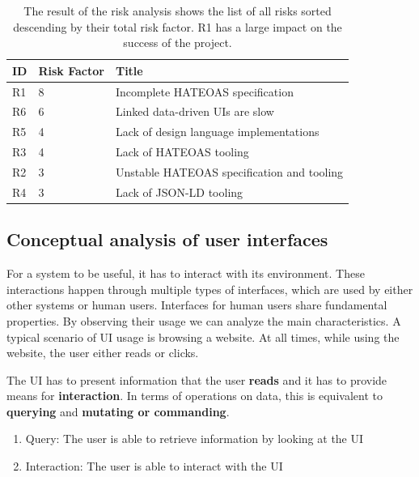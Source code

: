 \begin{table}[!htb]
  \begin{center}
    \begin{tabular}{|l|l|l|}
      \hline
      \textbf{ID} & \textbf{Risk Factor} & \textbf{Title} \\
      \hline
      \rowcolor{yellow}
      R1 & 8 & Incomplete HATEOAS specification \\
      \hline
      R6 & 6 & Linked data-driven UIs are slow \\
      \hline
      R5 & 4 & Lack of design language implementations \\
      \hline
      R3 & 4 & Lack of HATEOAS tooling \\
      \hline
      R2 & 3 & Unstable HATEOAS specification and tooling \\
      \hline
      R4 & 3 & Lack of JSON-LD tooling \\
      \hline
    \end{tabular}
    \caption{The result of the risk analysis shows the list of all risks sorted descending by their total risk factor. R1 has a large impact on the success of the project.}
    \label{tab:riskanalysis}
  \end{center}
\end{table}

\subsection{Conceptual analysis of user interfaces}
For a system to be useful, it has to interact with its environment. These interactions happen through multiple types of interfaces, which are used by either other systems or human users.
Interfaces for human users share fundamental properties. By observing their usage we can analyze the main characteristics. A typical scenario of UI usage is browsing a website. At all times, while using the website, the user either reads or clicks.

The UI has to present information that the user \textbf{reads} and it has to provide means for \textbf{interaction}. In terms of operations on data, this is equivalent to \textbf{querying} and \textbf{mutating or commanding}.

\begin{enumerate}
  \item Query: The user is able to retrieve information by looking at the UI
  \item Interaction: The user is able to interact with the UI
\end{enumerate}

